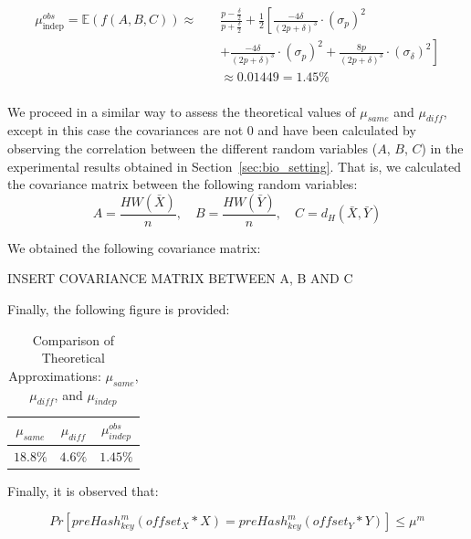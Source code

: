 \begin{equation}
    \begin{aligned}
    \mu_{\text{indep}}^{obs} = \mathbb{E}(f(A,B,C)) \approx \quad & \frac{p - \frac{\delta}{2}}{p + \frac{\delta}{2}} + \frac{1}{2} \left[ \frac{-4\delta}{(2p + \delta)^3} \cdot (\sigma_p)^2 \right. \\[2mm]
    & \left. + \frac{-4\delta}{(2p + \delta)^3} \cdot (\sigma_p)^2 + \frac{8p}{(2p + \delta)^3} \cdot (\sigma_\delta)^2 \right] \\[5mm]
    & \approx 0.01449 = 1.45\%
    \end{aligned}
    \label{eq:mu_indep}
\end{equation}\\

We proceed in a similar way to assess the theoretical values of $\mu_{same}$ and $\mu_{diff}$, except in this case the covariances are not \(0\) and have been calculated by observing the correlation between the different random variables (\(A\), \(B\), \(C\)) in the experimental results obtained in Section~\ref{sec:bio_setting}. That is, we calculated the covariance matrix between the following random variables:
\[
A = \frac{HW(\bar{X})}{n}, \quad B = \frac{HW(\bar{Y})}{n}, \quad C = d_H(\bar{X}, \bar{Y})
\]

We obtained the following covariance matrix:

INSERT COVARIANCE MATRIX BETWEEN A, B AND C



Finally, the following figure is provided:

\begin{table}[H]
    \centering
    \renewcommand{\arraystretch}{1.25}\begin{tabular}{|c|c|c|}
        \hline
        $\mu_{same}$ & $\mu_{diff}$ & $\mu^{obs}_{indep}$\\
        \hline
        $18.8\%$ & $4.6\%$ & $1.45\%$\\
        \hline
    \end{tabular}
\caption{Comparison of Theoretical Approximations: $\mu_{same}$, $\mu_{diff}$, and $\mu_{indep}$}
\label{tab:mu_approx}
\end{table}

Finally, it is observed that:

\begin{equation}
    Pr[preHash_{key}^m(offset_X * X) = preHash_{key}^m(offset_Y * Y)] \leq \mu^m
\end{equation}

